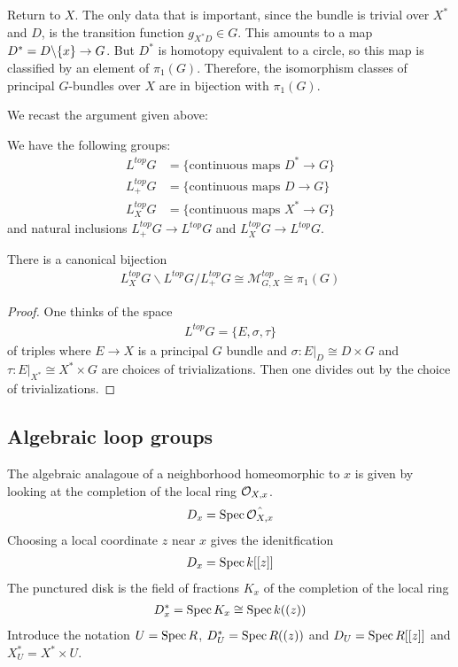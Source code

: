 \documentclass[12pt]{article}
\begin{document}
Return to $X$. The only data that is important, since the bundle is trivial over $X^*$ and $D$, is the transition function $g_{X^*D} \in G$. This amounts to a map $D^* = D \backslash \{x\} \to G$. But $D^*$ is homotopy equivalent to a circle, so this map is classified by an element of $\pi_1(G)$. Therefore, the isomorphism classes of principal $G$-bundles over $X$ are in bijection with $\pi_1(G)$.

We recast the argument given above:
\begin{definition}
    We have the following groups: \begin{align*}
        L^{top}G   & = \{ \text{continuous maps } D^* \to G \} \\
        L^{top}_+G & = \{ \text{continuous maps } D \to G \}   \\
        L^{top}_XG & = \{ \text{continuous maps } X^* \to G \}
    \end{align*} and natural inclusions $L^{top}_+G \to L^{top}G$ and $L^{top}_XG \to L^{top}G$.
\end{definition}
\begin{proposition}
    There is a canonical bijection \begin{align*}
        L^{top}_XG \backslash L^{top}G / L^{top}_+G \cong \mathcal{M}^{top}_{G,X} \cong \pi_1(G)
    \end{align*}
\end{proposition}

\begin{proof}
    One thinks of the space \begin{align*}
        L^{top}G = \{ E,\sigma,\tau \}
    \end{align*} of triples where $E \to X$ is a principal $G$ bundle and $\sigma:E\vert_D \cong D\times G$ and $\tau:E\vert_{X^*} \cong X^* \times G$ are choices of trivializations. Then one divides out by the choice of trivializations.
\end{proof}

\subsection{Algebraic loop groups}
The algebraic analagoue of a neighborhood homeomorphic to $x$ is given by looking at the completion of the local ring ${\mathcal{O}}_{X,x}$. \begin{align*}
    D_x = \operatorname{Spec} \hat{{\mathcal{O}}_{X,x}}
\end{align*} Choosing a local coordinate $z$ near $x$ gives the idenitfication \begin{align*}
    D_x = \operatorname{Spec} k[[z]]
\end{align*} The punctured disk is the field of fractions $K_x$ of the completion of the local ring \begin{align*}
    D_x^* = \operatorname{Spec} K_x \cong \operatorname{Spec} k((z))
\end{align*}
Introduce the notation $U = \operatorname{Spec} R$, $D_U^* = \operatorname{Spec} R((z))$ and $D_U = \operatorname{Spec} R[[z]]$ and $X^*_U = X^*\times U$.
\end{document}
